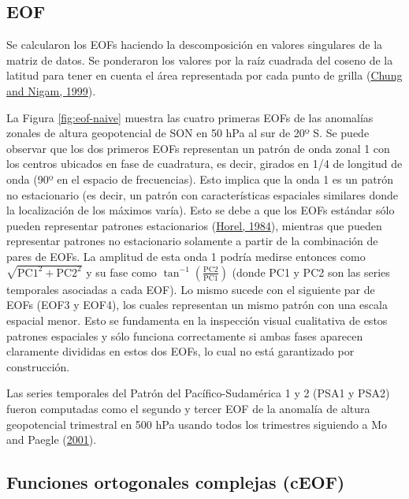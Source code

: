 \documentclass[12pt,oneside,a4paper]{reedthesis}
\begin{document}
\hypertarget{eof}{%
\subsection{EOF}\label{eof}}

Se calcularon los EOFs haciendo la descomposición en valores singulares de la matriz de datos.
Se ponderaron los valores por la raíz cuadrada del coseno de la latitud para tener en cuenta el área representada por cada punto de grilla (\protect\hyperlink{ref-chung1999}{Chung and Nigam, 1999}).

La Figura \ref{fig:eof-naive} muestra las cuatro primeras EOFs de las anomalías zonales de altura geopotencial de SON en 50 hPa al sur de 20º S.
Se puede observar que los dos primeros EOFs representan un patrón de onda zonal 1 con los centros ubicados en fase de cuadratura, es decir, girados en 1/4 de longitud de onda (90º en el espacio de frecuencias).
Esto implica que la onda 1 es un patrón no estacionario (es decir, un patrón con características espaciales similares donde la localización de los máximos varía).
Esto se debe a que los EOFs estándar sólo pueden representar patrones estacionarios (\protect\hyperlink{ref-horel1984}{Horel, 1984}), mientras que pueden representar patrones no estacionario solamente a partir de la combinación de pares de EOFs.
La amplitud de esta onda 1 podría medirse entonces como \(\sqrt{\mathrm{PC1}^2 + \mathrm{PC2}^2}\) y su fase como \(\tan^{-1} \left ( \frac{\mathrm{PC2}}{\mathrm{PC1}} \right )\) (donde PC1 y PC2 son las series temporales asociadas a cada EOF).
Lo mismo sucede con el siguiente par de EOFs (EOF3 y EOF4), los cuales representan un mismo patrón con una escala espacial menor.
Esto se fundamenta en la inspección visual cualitativa de estos patrones espaciales y sólo funciona correctamente si ambas fases aparecen claramente divididas en estos dos EOFs, lo cual no está garantizado por construcción.

Las series temporales del Patrón del Pacífico-Sudamérica 1 y 2 (PSA1 y PSA2) fueron computadas como el segundo y tercer EOF de la anomalía de altura geopotencial trimestral en 500 hPa usando todos los trimestres siguiendo a Mo and Paegle (\protect\hyperlink{ref-mo2001}{2001}).

\hypertarget{ceof-metodo}{%
\subsection{Funciones ortogonales complejas (cEOF)}\label{ceof-metodo}}
\end{document}
